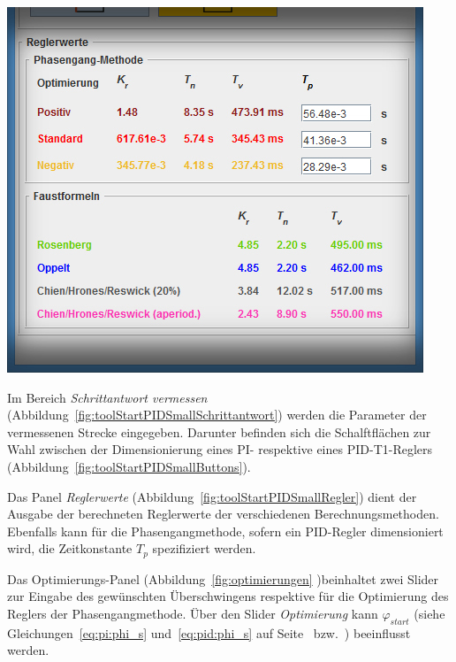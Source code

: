 \begin{minipage}[t][][b]{0.45\textwidth}
    \begin{minipage}[c][][b]{\textwidth}
        \centering
        \includegraphics[width=\textwidth]{images/toolStartPIDSmallRegler.jpg}
        \label{fig:toolStartPIDSmallRegler}
    \end{minipage}

\end{minipage}

Im             Bereich             \emph{Schrittantwort             vermessen}
(Abbildung~\ref{fig:toolStartPIDSmallSchrittantwort}) werden die Parameter der
vermessenen  Strecke eingegeben. Darunter  befinden sich  die Schalftfl\"achen
zur   Wahl   zwischen  der   Dimensionierung   eines   PI-  respektive   eines
PID-T1-Reglers (Abbildung~\ref{fig:toolStartPIDSmallButtons}).

Das  Panel   \emph{Reglerwerte}  (Abbildung~\ref{fig:toolStartPIDSmallRegler})
dient   der   Ausgabe   der    berechneten   Reglerwerte   der   verschiedenen
Berechnungsmethoden. Ebenfalls  kann f\"ur  die Phasengangmethode,  sofern ein
PID-Regler dimensioniert wird, die  Zeitkonstante $T_p$ spezifiziert werden.

Das    Optimierungs-Panel    (Abbildung~\ref{fig:optimierungen}    )beinhaltet
zwei    Slider     zur    Eingabe    des     gew\"unschten    \"Uberschwingens
respektive      f\"ur      die      Optimierung      des      Reglers      der
Phasengangmethode. \"Uber den Slider \emph{Optimierung} kann $\varphi_{start}$
(siehe      Gleichungen~\ref{eq:pi:phi_s}      und~\ref{eq:pid:phi_s}      auf
Seite~\pageref{eq:pi:phi_s} bzw.~\pageref{eq:pid:phi_s}) beeinflusst werden.

